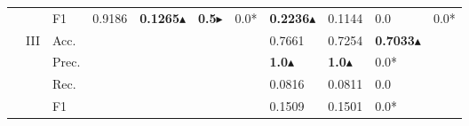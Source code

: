 \begin{tabular}{cclllllllll}
                                                                                                               &                                   & F1                                                   & 0.9186                  & \textbf{0.1265}$\blacktriangle$                 & \textbf{0.5}$\blacktriangleright$                  & 0.0*                    & \textbf{0.2236}$\blacktriangle$                                                             & 0.1144                                                                      & 0.0                                       & 0.0*                                      \\ 
    \cmidrule{2-11}
                                                                                                               & \multirow{4}{*}{III}              & Acc.                                                 &                         &                         &                              &                         & 0.7661                                                                       & 0.7254                                                                      & \textbf{0.7033}$\blacktriangle$                                   &                                           \\
                                                                                                               &                                   & Prec.                                                &                         &                         &                              &                         & \textbf{1.0}$\blacktriangle$                                                                         & \textbf{1.0}$\blacktriangle$                                                                        & 0.0*                                      &                                           \\
                                                                                                               &                                   & Rec.                                                 &                         &                         &                              &                         & 0.0816                                                                       & 0.0811                                                                      & 0.0                                       &                                           \\
                                                                                                               &                                   & F1                                                   &                         &                         &                              &                         & 0.1509                                                                       & 0.1501                                                                      & 0.0*                                      &                                           \\ 

\end{tabular}
